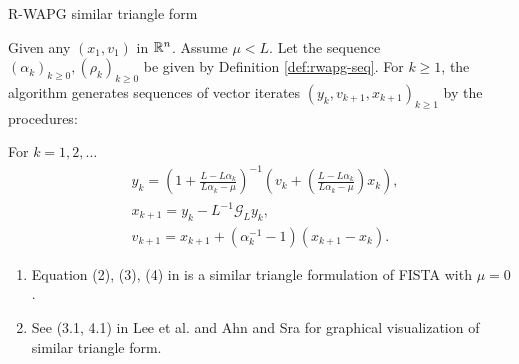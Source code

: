 \documentclass[11pt]{beamer}
\theoremstyle{definition}
\begin{document}
        \begin{frame}{R-WAPG similar triangle form}
            \begin{definition}\label{def:r-wapg-st-form}
            {\small
                Given any $(x_1, v_1)$ in $\mathbb R^n$. 
                Assume $\mu < L$.
                Let the sequence $(\alpha_k)_{k \ge 0}, (\rho_k)_{k\ge 0}$ be given by Definition \ref{def:rwapg-seq}. 
                For $k \ge 1$, the algorithm generates sequences of vector iterates $(y_k, v_{k + 1}, x_{k + 1})_{k \ge 1}$ by the procedures: 
                \begin{tcolorbox}
                    For $k=1, 2, \ldots $
                    {\scriptsize
                    \begin{align*}
                        & y_k = 
                        \left(
                            1 + \frac{L - L\alpha_k}{L\alpha_k - \mu}
                        \right)^{-1}
                        \left(
                            v_k + 
                            \left(\frac{L - L\alpha_k}{L\alpha_k - \mu} \right) x_k
                        \right), 
                        \\
                        & x_{k + 1} = 
                        y_k - L^{-1} \mathcal G_L y_k, 
                        \\
                        & v_{k + 1} = 
                        x_{k + 1} + (\alpha_k^{-1} -1)(x_{k + 1} - x_k). 
                    \end{align*}   
                    } 
                \end{tcolorbox}
            }
            \end{definition}
            \pause
            {\small
            \begin{enumerate}
                \item Equation (2), (3), (4) in \cite{chambolle_convergence_2015} is a similar triangle formulation of FISTA with $\mu = 0$. 
                \item See (3.1, 4.1) in Lee et al. \cite{lee_geometric_2021} and Ahn and Sra \cite{ahn_understanding_2022} for graphical visualization of similar triangle form. 
            \end{enumerate}
            }
        \end{frame}
\end{document}
